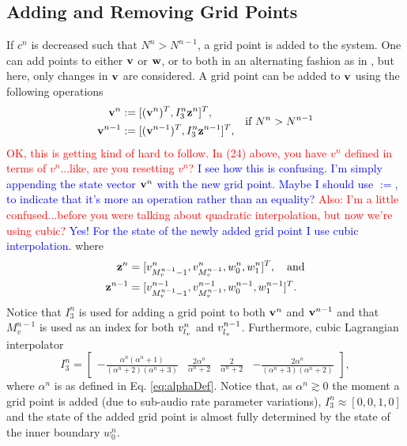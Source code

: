\documentclass[fleqn]{jaes}
\def\SBcomment[#1]{\textcolor{red}{#1}}
\def\SWcomment[#1]{\textcolor{blue}{#1}}
\begin{document}
\subsection{Adding and Removing Grid Points}\label{sec:addRemove}
If $c^n$ is decreased such that $N^n > N^{n-1}$, a grid point is added to the system. One can add points to either $\mathbf{v}$ or $\mathbf{w}$, or to both in an alternating fashion as in \cite{Willemsen2021a}, but here, only changes in $\mathbf{v}$ are considered. A grid point can be added to $\mathbf{v}$ using the following operations
\begin{equation}
\begin{aligned}
    \v^n &:= [(\v^n)^T, I_3^n\z^n]^T,\\
    \v^{n-1} &:= [(\v^{n-1})^T, I_3^n\z^{n-1}]^T,\\
\end{aligned} \quad \text{if } N^n > N^{n-1}
\end{equation}
\SBcomment[OK, this is getting kind of hard to follow. In (24) above, you have $v^{n}$ defined in terms of $v^{n}$...like, are you resetting $v^{n}$?] \SWcomment[I see how this is confusing. I'm simply appending the state vector $\mathbf{v}^n$ with the new grid point. Maybe I should use $:=$, to indicate that it's more an operation rather than an equality?] \SBcomment[Also: I'm a little confused...before you were talking about quadratic interpolation, but now we're using cubic?] \SWcomment[Yes! For the state of the newly added grid point I use cubic interpolation.] where
\begin{equation*}
    \begin{aligned}
        \z^n &= [v_{M_v^{n-1}-1}^n, v_{M_v^{n-1}}^n, w_0^n, w_1^n]^T, \quad \text{and}\\
        \z^{n-1} &= [v_{M_v^{n-1}-1}^{n-1}, v_{M_v^{n-1}}^{n-1}, w_0^{n-1}, w_1^{n-1}]^T.
    \end{aligned}
\end{equation*}
Notice that $I_3^n$ is used for adding a grid point to both $\mathbf{v}^n$ and $\mathbf{v}^{n-1}$ and that $M_v^{n-1}$ is used as an index for both $v^n_{l_v}$ and $v^{n-1}_{l_v}$.
Furthermore, cubic Lagrangian interpolator
\begin{equation}\label{eq:customIp}
    I_3^n = \begin{bmatrix} -\frac{\alpha^n(\alpha^n+1)}{(\alpha^n+2)(\alpha^n+3)} &\frac{2\alpha^n}{\alpha^n+2} &\frac{2}{\alpha^n+2} 
    &-\frac{2\alpha^n}{(\alpha^n+3)(\alpha^n+2)}
    \end{bmatrix},
\end{equation}
where $\alpha^n$ is as defined in Eq. \eqref{eq:alphaDef}. Notice that, as $\alpha^n \gtrsim 0$ the moment a grid point is added (due to sub-audio rate parameter variations), $I_3^n\approx [0, 0, 1, 0]$ and the state of the added grid point is almost fully determined by the state of the inner boundary $w_0^n$. 
\end{document}
